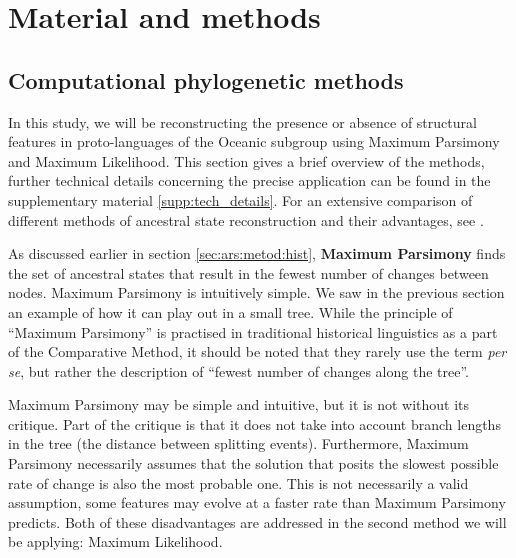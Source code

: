 \documentclass[a4paper,10pt]{article} %
\begin{document}

\section{Material and methods}
\subsection{Computational phylogenetic methods}
\label{sec:asr_methods}

In this study, we will be reconstructing the presence or absence of structural features in proto-languages of the Oceanic subgroup using Maximum Parsimony and Maximum Likelihood. This section gives a brief overview of the methods, further technical details concerning the precise application can be found in the supplementary material \ref{supp:tech_details}. For an extensive comparison of different methods of ancestral state reconstruction and their advantages, see \citet{joy2016ancestral}.

As discussed earlier in section \ref{sec:ars:metod:hist}, \textbf{Maximum Parsimony} finds the set of ancestral states that result in the fewest number of changes between nodes. Maximum Parsimony is intuitively simple. We saw in the previous section an example of how it can play out in a small tree. While the principle of ``Maximum Parsimony'' is practised in traditional historical linguistics as a part of the Comparative Method, it should be noted that they rarely use the term \emph{per se}, but rather the description of ``fewest number of changes along the tree''.

Maximum Parsimony may be simple and intuitive, but it is not without its critique. Part of the critique is that it does not take into account branch lengths in the tree (the distance between splitting events). Furthermore, Maximum Parsimony necessarily assumes that the solution that posits the slowest possible rate of change is also the most probable one. This is not necessarily a valid assumption, some features may evolve at a faster rate than Maximum Parsimony predicts. Both of these disadvantages are addressed in the second method we will be applying: Maximum Likelihood.
\end{document}
